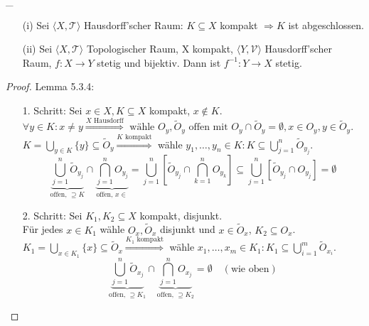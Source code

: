 \begin{corollary}{}
    _
    \begin{itemize}
        \item[(i)] Sei $\langle X, \mathcal{T} \rangle$ Hausdorff'scher Raum: $K \subseteq X$ kompakt 
        $\Rightarrow K$ ist abgeschlossen.
        \item[(ii)] Sei $\langle X, \mathcal{T} \rangle$ Topologischer Raum, X kompakt,
        $\langle Y, \mathcal{V} \rangle$ Hausdorff'scher Raum,
        $f : X \to Y$ stetig und bijektiv. Dann ist $f^{-1} : Y \to X$ stetig.
    \end{itemize}
\end{corollary}


\begin{proof}{Lemma 5.3.4:}\\
  \begin{itemize}
    \item[1. Schritt:] Sei $x \in X, K \subseteq X$ kompakt, $x \notin K$.\\
    $\forall y \in K : x \neq y \overset{X \text{ Hausdorff}}{\Rightarrow} 
    \text{ wähle } O_y, \tilde{O}_y \text{ offen mit } 
    O_y \cap \tilde{O}_y = \emptyset, x \in O_y, y \in \tilde{O}_y.$\\
    $K = \bigcup_{y \in K} \{y\} \subseteq\tilde{O}_y 
    \overset{K \text{ kompakt}}{\Rightarrow}$
    wähle $y_1, \ldots, y_n \in K : K \subseteq \bigcup_{j=1}^{n} \tilde{O}_{y_j}.$\\
    $$
    \underbrace{\bigcup_{j=1}^n \tilde{O}_{y_j}}_{\text{offen, } \supseteq K}
    \cap
    \underbrace{\bigcap_{j=1}^n O_{y_j}}_{\text{offen, } x \in}
    = 
    \bigcup_{j=1}^n [\tilde{O}_{y_j} \cap \bigcap_{k=1}^n O_{y_k}]
    \subseteq
    \bigcup_{j=1}^n [\tilde{O}_{y_j} \cap O_{y_j}]
    = \emptyset
    $$
    \item[2. Schritt:] Sei $K_1, K_2 \subseteq X$ kompakt, disjunkt.\\
    Für jedes $x \in K_1$ wähle $O_x, \tilde{O}_x$ disjunkt und 
    $x \in \tilde{O}_x$, $K_2 \subseteq O_x$.\\
    $K_1 = \bigcup_{x \in K_1} \{x\} \subseteq \tilde{O}_x
    \overset{K_1 \text{ kompakt}}{\Rightarrow}$
    wähle $x_1, \ldots, x_m \in K_1 : K_1 \subseteq 
    \bigcup_{i=1}^{m} \tilde{O}_{x_i}.$\\
    $$
    \underbrace{\bigcup_{j=1}^n \tilde{O}_{x_j}}_{\text{offen, } \supseteq K_1}
    \cap
    \underbrace{\bigcap_{j=1}^n O_{x_j}}_{\text{offen, } \supseteq K_2}
    = \emptyset 
    \quad (\text{wie oben})
    $$
  \end{itemize}
\end{proof}



